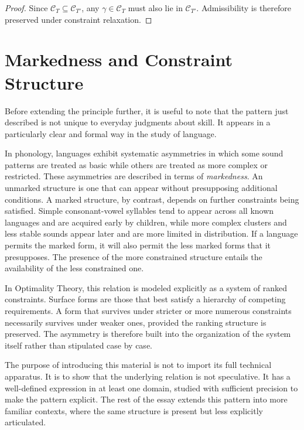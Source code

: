 \documentclass[12pt, a4paper]{article}
\begin{document}
\begin{proof}
Since $\mathcal{C}_T \subseteq \mathcal{C}_{T'}$, any $\gamma \in \mathcal{C}_T$ must also lie in $\mathcal{C}_{T'}$. Admissibility is therefore preserved under constraint relaxation.
\end{proof}


\section{Markedness and Constraint Structure}

Before extending the principle further, it is useful to note that the pattern just described is not unique to everyday judgments about skill. It appears in a particularly clear and formal way in the study of language.

In phonology, languages exhibit systematic asymmetries in which some sound patterns are treated as basic while others are treated as more complex or restricted. These asymmetries are described in terms of \emph{markedness}. An unmarked structure is one that can appear without presupposing additional conditions. A marked structure, by contrast, depends on further constraints being satisfied. Simple consonant-vowel syllables tend to appear across all known languages and are acquired early by children, while more complex clusters and less stable sounds appear later and are more limited in distribution. If a language permits the marked form, it will also permit the less marked forms that it presupposes. The presence of the more constrained structure entails the availability of the less constrained one.

In Optimality Theory, this relation is modeled explicitly as a system of ranked constraints. Surface forms are those that best satisfy a hierarchy of competing requirements. A form that survives under stricter or more numerous constraints necessarily survives under weaker ones, provided the ranking structure is preserved. The asymmetry is therefore built into the organization of the system itself rather than stipulated case by case.

The purpose of introducing this material is not to import its full technical apparatus. It is to show that the underlying relation is not speculative. It has a well-defined expression in at least one domain, studied with sufficient precision to make the pattern explicit. The rest of the essay extends this pattern into more familiar contexts, where the same structure is present but less explicitly articulated.
\end{document}

